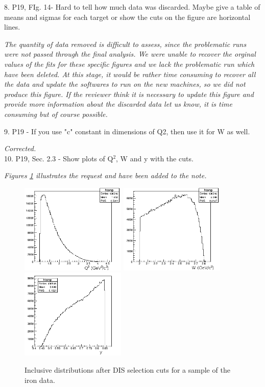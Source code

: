 \documentclass[12pt]{article}
\begin{document}
8.
P19, FIg. 14- Hard to tell how much data was discarded. Maybe give a table of means and 
sigmas for each target or show the cuts on the figure are horizontal lines.

{\it The quantity of data removed is difficult to assess, since the problematic runs were
not passed through the final analysis. We were unable to recover the orginal values of the
fits for these specific figures and we 
lack the problematic run which have been deleted. At this stage, it would be rather time
consuming to recover all the data and update the softwares to run on the new machines, so 
we did not produce this figure. If the reviewer think it is necessary to update this 
figure and provide more information about the discarded data let us know, it is time 
consuming but of course possible.}

9.
P19 - If you use "c" constant in dimensions of Q2, then use it for W as well.

{\it Corrected.} \\

10.
P19, Sec. 2.3 - Show plots of Q$^2$, W and y with the cuts.

{\it Figures \ref{DISKine} illustrates the request and have been added to the note.} \\

\begin{figure}[tbp]
\centering
\includegraphics[width=5cm] {answer-fig/DIS-Q2.png} 
\includegraphics[width=5cm] {answer-fig/DIS-w.png} 
\includegraphics[width=5cm] {answer-fig/DIS-y.png} 
\caption {Inclusive distributions after DIS selection cuts for a sample of the iron
data.}
\label{DISKine}
\end{figure}
\end{document}
